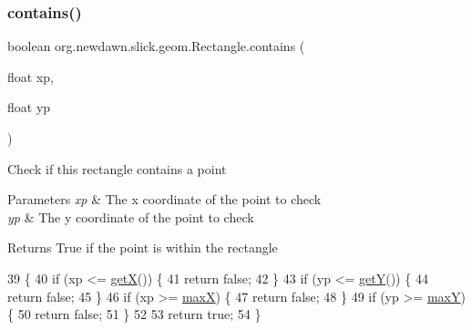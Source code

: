 \subsubsection{\texorpdfstring{contains()}{contains()}\hspace{0.1cm}{\footnotesize\ttfamily [1/2]}}
{\footnotesize\ttfamily boolean org.\+newdawn.\+slick.\+geom.\+Rectangle.\+contains (\begin{DoxyParamCaption}\item[{float}]{xp,  }\item[{float}]{yp }\end{DoxyParamCaption})\hspace{0.3cm}{\ttfamily [inline]}}

Check if this rectangle contains a point


\begin{DoxyParams}{Parameters}
{\em xp} & The x coordinate of the point to check \\
\hline
{\em yp} & The y coordinate of the point to check \\
\hline
\end{DoxyParams}
\begin{DoxyReturn}{Returns}
True if the point is within the rectangle 
\end{DoxyReturn}

\begin{DoxyCode}
39                                                 \{
40         \textcolor{keywordflow}{if} (xp <= \mbox{\hyperlink{classorg_1_1newdawn_1_1slick_1_1geom_1_1_shape_a736a47bfdd6f164558b43fd497a3a3f3}{getX}}()) \{
41             \textcolor{keywordflow}{return} \textcolor{keyword}{false};
42         \}
43         \textcolor{keywordflow}{if} (yp <= \mbox{\hyperlink{classorg_1_1newdawn_1_1slick_1_1geom_1_1_shape_a5f334f962d8fc525d522fe0f8ac20b35}{getY}}()) \{
44             \textcolor{keywordflow}{return} \textcolor{keyword}{false};
45         \}
46         \textcolor{keywordflow}{if} (xp >= \mbox{\hyperlink{classorg_1_1newdawn_1_1slick_1_1geom_1_1_shape_a8c820b5a7df465beab7f021cdd09b826}{maxX}}) \{
47             \textcolor{keywordflow}{return} \textcolor{keyword}{false};
48         \}
49         \textcolor{keywordflow}{if} (yp >= \mbox{\hyperlink{classorg_1_1newdawn_1_1slick_1_1geom_1_1_shape_aaacbabfb1b7d0653f59658d92ded1c2b}{maxY}}) \{
50             \textcolor{keywordflow}{return} \textcolor{keyword}{false};
51         \}
52         
53         \textcolor{keywordflow}{return} \textcolor{keyword}{true};
54     \}
\end{DoxyCode}
\mbox{\label{classorg_1_1newdawn_1_1slick_1_1geom_1_1_rectangle_a98804c198f5ebeea4325a3a83665d30b}} 
